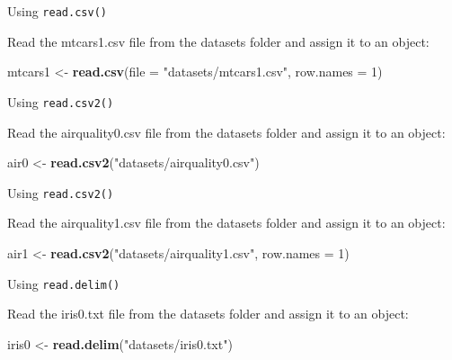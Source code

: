 \documentclass[ignorenonframetext,]{beamer}
\newenvironment{Shaded}{\begin{snugshade}}{\end{snugshade}}
\newcommand{\DataTypeTok}[1]{\textcolor[rgb]{0.13,0.29,0.53}{#1}}
\newcommand{\DecValTok}[1]{\textcolor[rgb]{0.00,0.00,0.81}{#1}}
\newcommand{\KeywordTok}[1]{\textcolor[rgb]{0.13,0.29,0.53}{\textbf{#1}}}
\newcommand{\NormalTok}[1]{#1}
\newcommand{\StringTok}[1]{\textcolor[rgb]{0.31,0.60,0.02}{#1}}
\begin{document}
\begin{frame}[fragile]{Using \texttt{read.csv()}}
\protect\hypertarget{using-read.csv-1}{}

Read the mtcars1.csv file from the datasets folder and assign it to an
object:

\begin{Shaded}
\begin{Highlighting}[]
\NormalTok{mtcars1 <-}\StringTok{ }\KeywordTok{read.csv}\NormalTok{(}\DataTypeTok{file =} \StringTok{"datasets/mtcars1.csv"}\NormalTok{,}
                    \DataTypeTok{row.names =} \DecValTok{1}\NormalTok{)}
\end{Highlighting}
\end{Shaded}

\end{frame}

\begin{frame}[fragile]{Using \texttt{read.csv2()}}
\protect\hypertarget{using-read.csv2}{}

Read the airquality0.csv file from the datasets folder and assign it to
an object:

\begin{Shaded}
\begin{Highlighting}[]
\NormalTok{air0 <-}\StringTok{ }\KeywordTok{read.csv2}\NormalTok{(}\StringTok{"datasets/airquality0.csv"}\NormalTok{)}
\end{Highlighting}
\end{Shaded}

\end{frame}

\begin{frame}[fragile]{Using \texttt{read.csv2()}}
\protect\hypertarget{using-read.csv2-1}{}

Read the airquality1.csv file from the datasets folder and assign it to
an object:

\begin{Shaded}
\begin{Highlighting}[]
\NormalTok{air1 <-}\StringTok{ }\KeywordTok{read.csv2}\NormalTok{(}\StringTok{"datasets/airquality1.csv"}\NormalTok{,}
                  \DataTypeTok{row.names =} \DecValTok{1}\NormalTok{) }
\end{Highlighting}
\end{Shaded}

\end{frame}

\begin{frame}[fragile]{Using \texttt{read.delim()}}
\protect\hypertarget{using-read.delim}{}

Read the iris0.txt file from the datasets folder and assign it to an
object:

\begin{Shaded}
\begin{Highlighting}[]
\NormalTok{iris0 <-}\StringTok{ }\KeywordTok{read.delim}\NormalTok{(}\StringTok{"datasets/iris0.txt"}\NormalTok{)}
\end{Highlighting}
\end{Shaded}

\end{frame}
\end{document}
